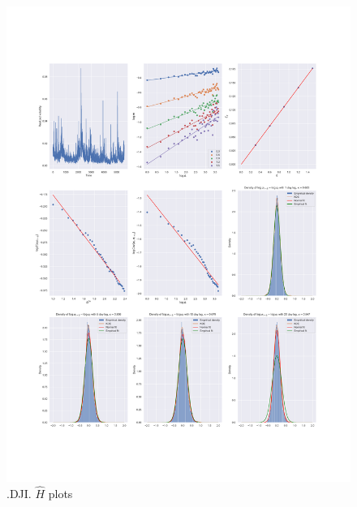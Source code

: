 	\begin{figure}[h]
		\centering
		\includegraphics[width=\linewidth]{fig/.DJI.pdf}
		\caption{.DJI. $\hat{H}$ plots}
	\end{figure}

